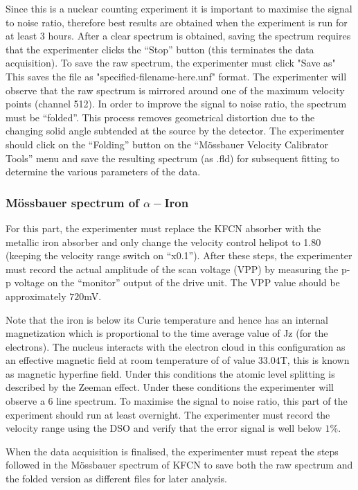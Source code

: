 \documentclass[a4paper, twocolumn]{article}
\begin{document}
Since this is a nuclear counting experiment it is important to maximise the signal to noise ratio, therefore best results are obtained when the experiment is run for at least 3 hours. After a clear spectrum is obtained, saving the spectrum requires that the experimenter clicks the “Stop” button (this terminates the data acquisition). To save the raw spectrum, the experimenter must click "Save as" This saves the file as "specified-filename-here.unf" format.
The experimenter will observe that the raw spectrum is mirrored around one of the maximum velocity points (channel 512)\cite{0}. In order to improve the signal to noise ratio, the spectrum must be “folded”. This process removes geometrical distortion due to the changing solid angle subtended at the source by the detector. The experimenter should click on the “Folding” button on the “Mössbauer Velocity Calibrator Tools” menu and save the resulting spectrum (as .fld) for subsequent fitting to determine the various parameters of the data\cite{0}.

\subsubsection{Mössbauer spectrum of $\alpha-$Iron}

For this part, the experimenter must replace the KFCN absorber with the metallic iron absorber and only change the velocity control helipot to 1.80 (keeping the velocity range switch on “x0.1”). After these steps, the experimenter must record the actual amplitude of the scan voltage (VPP) by measuring the p-p voltage on the “monitor” output of the drive unit. The VPP value should be approximately $720$mV\cite{0}.

Note that the iron is below its Curie temperature and hence has an internal magnetization which is proportional to the time average value of Jz (for the electrons). The nucleus interacts with the electron cloud in this configuration as an effective magnetic field at room temperature of of value $33.04$T, this is known as magnetic hyperfine field. Under this conditions the atomic level splitting is described by the Zeeman effect. Under these conditions the experimenter will observe a 6 line spectrum\cite{0}\cite{8}.
To maximise the signal to noise ratio, this part of the experiment should run at least overnight. The experimenter must record the velocity range using the DSO and verify that the error signal is well below $1\%$\cite{0}.

When the data acquisition is finalised, the experimenter must repeat the steps followed in the Mössbauer spectrum of KFCN to save both the raw spectrum and the folded version as different files for later analysis\cite{0}.
\end{document}
